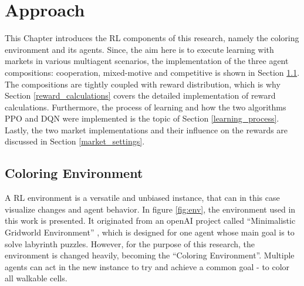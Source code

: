 %
%
\chapter{Approach}\label{sec:Concept}
This Chapter introduces the RL components of this research, namely the coloring environment and its agents. Since, the aim here is to execute learning with markets in various multiagent scenarios, the implementation of the three agent compositions: cooperation, mixed-motive and competitive is shown in Section \ref{env}. The compositions are tightly coupled with reward distribution, which is why Section \ref{reward_calculations} covers the detailed implementation of reward calculations. Furthermore, the process of learning and how the two algorithms PPO and DQN were implemented is the topic of Section \ref{learning_process}. Lastly, the two market implementations and their influence on the rewards are discussed in Section \ref{market_settings}.

\section{Coloring Environment}\label{env}
A RL environment is a versatile and unbiased instance, that can in this case visualize changes and agent behavior.
In figure \ref{fig:env}, the environment used in this work is presented. It originated from an openAI project called ``Minimalistic Gridworld Environment'' \cite{chwi18}, which is designed for one agent whose main goal is to solve labyrinth puzzles. However, for the purpose of this research, the environment is changed heavily, becoming the ``Coloring Environment''. Multiple agents can act in the new instance to try and achieve a common goal - to color all walkable cells.

